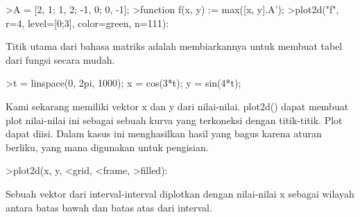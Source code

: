 \documentclass[a4paper,10pt]{article}
\begin{document}
\begin{eulernotebook}
\begin{eulercomment}
\begin{eulercomment}
\begin{eulercomment}
\begin{eulercomment}
\begin{eulercomment}
\end{eulercomment}
\begin{eulerprompt}
>A = [2, 1; 1, 2; -1, 0; 0, -1];
>function f(x, y) := max([x, y].A');
>plot2d("f", r=4, level=[0;3], color=green, n=111):
\end{eulerprompt}
\begin{eulercomment}
Titik utama dari bahasa matriks adalah membiarkannya untuk membuat
tabel  dari fungsi secara mudah.
\end{eulercomment}
\begin{eulerprompt}
>t = linspace(0, 2pi, 1000); x = cos(3*t); y = sin(4*t);
\end{eulerprompt}
\begin{eulercomment}
Kami sekarang memiliki vektor x dan y dari nilai-nilai. plot2d() dapat
membuat plot nilai-nilai ini sebagai sebuah kurva yang terkoneksi
dengan titik-titik. Plot dapat diisi. Dalam kasus ini menghasilkan
hasil yang bagus karena aturan berliku, yang mana digunakan untuk
pengisian.
\end{eulercomment}
\begin{eulerprompt}
>plot2d(x, y, <grid, <frame, >filled):
\end{eulerprompt}
\begin{eulercomment}
Sebuah vektor dari interval-interval diplotkan dengan nilai-nilai x
sebagai wilayah antara batas bawah dan batas atas dari interval.


\end{eulercomment}
\end{eulercomment}
\end{eulercomment}
\end{eulercomment}
\end{eulercomment}
\end{eulernotebook}
\end{document}
